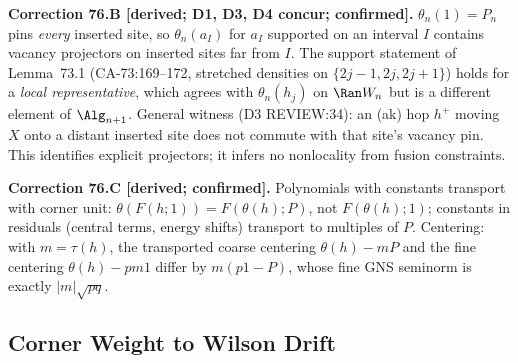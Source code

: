 \textbf{Correction 76.B [derived; D1, D3, D4 concur; confirmed].}  \(\theta_n(1)=P_n\) pins \emph{every} inserted site,
so \(\theta_n(a_I)\) for \(a_I\) supported on an interval \(I\) contains vacancy projectors on inserted sites far from
\(I\).  The support statement of Lemma~73.1 (CA-73:169--172, stretched densities on \(\{2j-1,2j,2j+1\}\)) holds for a
\emph{local representative}, which agrees with \(\theta_n(h_j)\) on \(\Ran W_n\) but is a different element of
\(\Alg_{n+1}\).  General witness (D3 REVIEW:34): an (ak) hop \(h^+\) moving \(X\) onto a distant inserted site does not
commute with that site's vacancy pin.  This identifies explicit projectors; it infers no nonlocality from fusion
constraints.

\textbf{Correction 76.C [derived; confirmed].}  Polynomials with constants transport with corner unit:
\(\theta(F(h;1))=F(\theta(h);P)\), not \(F(\theta(h);1)\); constants in residuals (central terms, energy shifts)
transport to multiples of \(P\).  Centering: with \(m=\tau(h)\), the transported coarse centering \(\theta(h)-mP\) and
the fine centering \(\theta(h)-pm1\) differ by \(m(p1-P)\), whose fine GNS seminorm is exactly \(|m|\sqrt{pq}\).

\subsection{Corner Weight to Wilson Drift}

